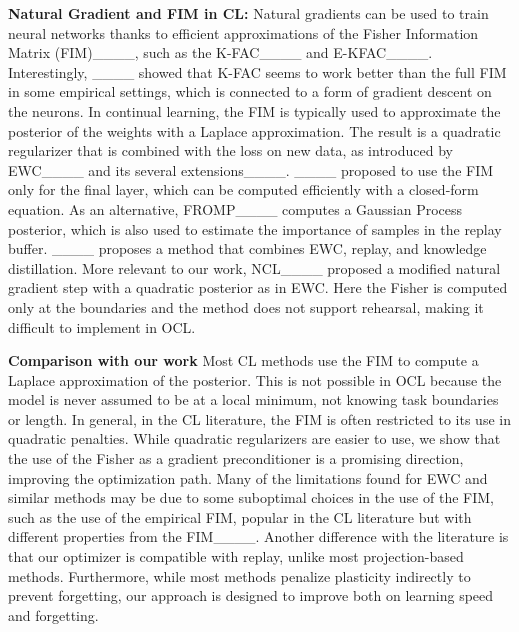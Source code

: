 \textbf{Natural Gradient and FIM in CL:} Natural gradients can be used to train neural networks thanks to efficient approximations of the Fisher Information Matrix (FIM)____, such as the K-FAC____ and E-KFAC____. Interestingly, ____ showed that K-FAC seems to work better than the full FIM in some empirical settings, which is connected to a form of gradient descent on the neurons. In continual learning, the FIM is typically used to approximate the posterior of the weights with a Laplace approximation. The result is a quadratic regularizer that is combined with the loss on new data, as introduced by EWC____ and its several extensions____. ____ proposed to use the FIM only for the final layer, which can be computed efficiently with a closed-form equation. As an alternative, FROMP____ computes a Gaussian Process posterior, which is also used to estimate the importance of samples in the replay buffer. ____ proposes a method that combines EWC, replay, and knowledge distillation. More relevant to our work, NCL____ proposed a modified natural gradient step with a quadratic posterior as in EWC. Here the Fisher is computed only at the boundaries and the method does not support rehearsal, making it difficult to implement in OCL.

\textbf{Comparison with our work} Most CL methods use the FIM to compute a Laplace approximation of the posterior. This is not possible in OCL because the model is never assumed to be at a local minimum, not knowing task boundaries or length. In general, in the CL literature, the FIM is often restricted to its use in quadratic penalties. While quadratic regularizers are easier to use, we show that the use of the Fisher as a gradient preconditioner is a promising direction, improving the optimization path. Many of the limitations found for EWC and similar methods may be due to some suboptimal choices in the use of the FIM, such as the use of the empirical FIM, popular in the CL literature but with different properties from the FIM____. Another difference with the literature is that our optimizer is compatible with replay, unlike most projection-based methods. Furthermore, while most methods penalize plasticity indirectly to prevent forgetting, our approach is designed to improve both on learning speed and forgetting.